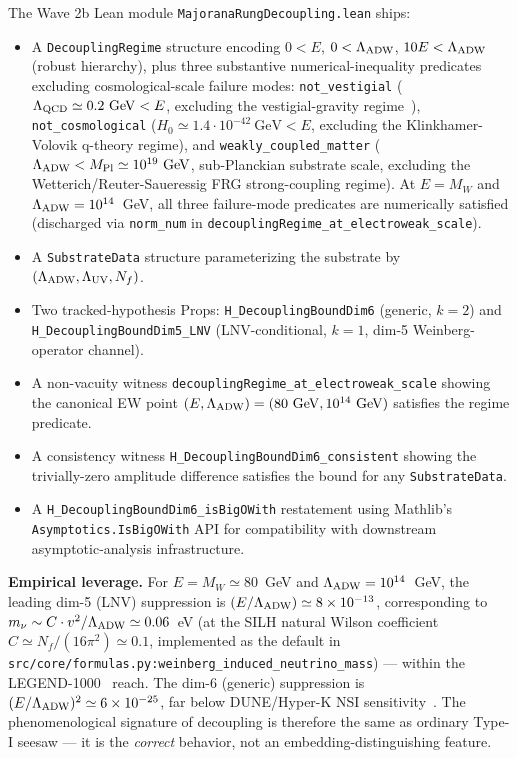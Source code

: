 \documentclass[aps,prd,twocolumn,showpacs,superscriptaddress,nofootinbib]{revtex4-2}
\newcommand{\LambdaADW}{\Lambda_{\rm ADW}}
\begin{document}
The Wave 2b Lean module \texttt{MajoranaRungDecoupling.lean} ships:
\begin{itemize}
\item A \texttt{DecouplingRegime} structure encoding $0 < E$, $0 < \LambdaADW$,
  $10 E < \LambdaADW$ (robust hierarchy), plus three substantive
  numerical-inequality predicates excluding cosmological-scale failure modes:
  \texttt{not\_vestigial} ($\Lambda_{\rm QCD} \simeq 0.2~\mathrm{GeV} < E$,
  excluding the vestigial-gravity regime~\cite{Volovik2024Spinor}),
  \texttt{not\_cosmological} ($H_0 \simeq 1.4 \cdot 10^{-42}~\mathrm{GeV} < E$,
  excluding the Klinkhamer-Volovik q-theory regime), and
  \texttt{weakly\_coupled\_matter} ($\LambdaADW < M_{\rm Pl} \simeq 10^{19}~\mathrm{GeV}$,
  sub-Planckian substrate scale, excluding the Wetterich/Reuter-Saueressig
  FRG strong-coupling regime). At $E = M_W$ and
  $\LambdaADW = 10^{14}$~GeV, all three failure-mode predicates are
  numerically satisfied (discharged via \texttt{norm\_num} in
  \texttt{decouplingRegime\_at\_electroweak\_scale}).
\item A \texttt{SubstrateData} structure parameterizing the substrate by
  $(\LambdaADW, \Lambda_{\rm UV}, N_f)$.
\item Two tracked-hypothesis Props:
  \texttt{H\_DecouplingBoundDim6} (generic, $k=2$) and
  \texttt{H\_DecouplingBoundDim5\_LNV} (LNV-conditional, $k=1$, dim-5
  Weinberg-operator channel).
\item A non-vacuity witness \texttt{decouplingRegime\_at\_electroweak\_scale}
  showing the canonical EW point $(E, \LambdaADW) = (80~\mathrm{GeV}, 10^{14}~\mathrm{GeV})$
  satisfies the regime predicate.
\item A consistency witness \texttt{H\_DecouplingBoundDim6\_consistent} showing
  the trivially-zero amplitude difference satisfies the bound for any
  \texttt{SubstrateData}.
\item A \texttt{H\_DecouplingBoundDim6\_isBigOWith} restatement using Mathlib's
  \texttt{Asymptotics.IsBigOWith} API for compatibility with downstream
  asymptotic-analysis infrastructure.
\end{itemize}

\textbf{Empirical leverage.} For $E = M_W \simeq 80$~GeV and $\LambdaADW
= 10^{14}$~GeV, the leading dim-5 (LNV) suppression is
$(E/\LambdaADW) \simeq 8 \times 10^{-13}$, corresponding to
$m_\nu \sim C \cdot v^2 / \LambdaADW \simeq 0.06$~eV
(at the SILH natural Wilson coefficient $C \simeq N_f/(16\pi^2) \simeq 0.1$,
implemented as the default in
\texttt{src/core/formulas.py:weinberg\_induced\_neutrino\_mass}) — within
the LEGEND-1000~\cite{LEGEND1000} reach. The dim-6 (generic) suppression
is $(E/\LambdaADW)^2 \simeq 6 \times 10^{-25}$, far below DUNE/Hyper-K NSI
sensitivity~\cite{CiriglianoMasterFormula2018}. The phenomenological signature
of decoupling is therefore the same as ordinary Type-I seesaw — it is the
\emph{correct} behavior, not an embedding-distinguishing feature.
\end{document}
